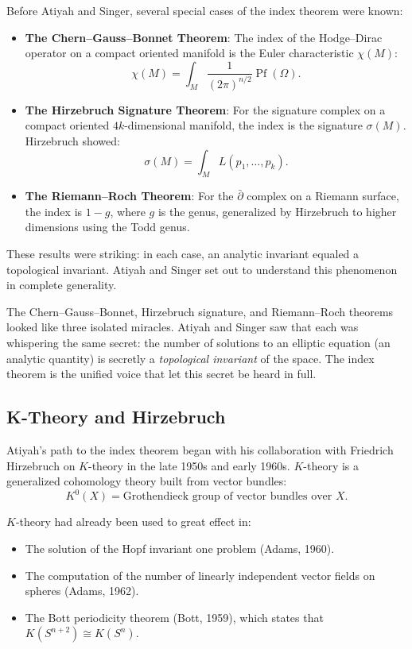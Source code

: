 Before Atiyah and Singer, several special cases of the index theorem were known:

\begin{itemize}
\item \textbf{The Chern--Gauss--Bonnet Theorem}: The index of the Hodge--Dirac operator on a compact oriented manifold is the Euler characteristic $\chi(M)$:
\[
\chi(M) = \int_M \frac{1}{(2\pi)^{n/2}} \operatorname{Pf}(\Omega).
\]

\item \textbf{The Hirzebruch Signature Theorem}: For the signature complex on a compact oriented $4k$-dimensional manifold, the index is the signature $\sigma(M)$. Hirzebruch showed:
\[
\sigma(M) = \int_M L(p_1, \ldots, p_k).
\]

\item \textbf{The Riemann--Roch Theorem}: For the $\bar\partial$ complex on a Riemann surface, the index is $1 - g$, where $g$ is the genus, generalized by Hirzebruch to higher dimensions using the Todd genus.
\end{itemize}

These results were striking: in each case, an analytic invariant equaled a topological invariant. Atiyah and Singer set out to understand this phenomenon in complete generality.

\begin{bigidea}
The Chern--Gauss--Bonnet, Hirzebruch signature, and Riemann--Roch theorems looked like three isolated miracles. Atiyah and Singer saw that each was whispering the same secret: the number of solutions to an elliptic equation (an analytic quantity) is secretly a \emph{topological invariant} of the space. The index theorem is the unified voice that let this secret be heard in full.
\end{bigidea}

\subsection{K-Theory and Hirzebruch}

Atiyah's path to the index theorem began with his collaboration with Friedrich Hirzebruch on $K$-theory in the late 1950s and early 1960s. $K$-theory is a generalized cohomology theory built from vector bundles:
\[
K^0(X) = \text{Grothendieck group of vector bundles over } X.
\]

$K$-theory had already been used to great effect in:
\begin{itemize}
\item The solution of the Hopf invariant one problem (Adams, 1960).
\item The computation of the number of linearly independent vector fields on spheres (Adams, 1962).
\item The Bott periodicity theorem (Bott, 1959), which states that $K(S^{n+2}) \cong K(S^n)$.
\end{itemize}

